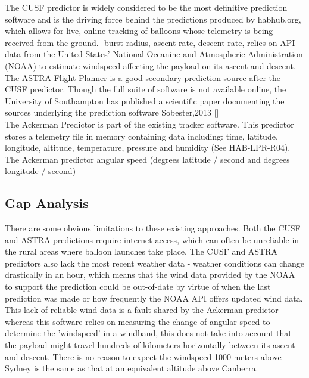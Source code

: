 \documentclass[11pt]{article}
\begin{document}
The CUSF predictor is widely considered to be the most definitive prediction software and is the driving force behind the predictions produced by habhub.org, which allows for live, online tracking of balloons whose telemetry is being received from the ground. -burst radius, ascent rate, descent rate, relies on API data from the United States' National Oceaninc and Atmospheric Administration (NOAA) to estimate windspeed affecting the payload on its ascent and descent. \\

The ASTRA Flight Planner is a good secondary prediction source after the CUSF predictor. Though the full suite of software is not available online, the University of Southampton has published a scientific paper documenting the sources underlying the prediction software Sobester,2013 []\\

The Ackerman Predictor is part of the existing tracker software. This predictor stores a telemetry file in memory containing data including: time, latitude, longitude, altitude, temperature, pressure and humidity (See HAB-LPR-R04). The Ackerman predictor angular speed (degrees latitude / second and degrees longitude / second)  \\

\subsection{Gap Analysis}

There are some obvious limitations to these existing approaches. Both the CUSF and ASTRA predictions require internet access, which can often be unreliable in the rural areas where balloon launches take place. The CUSF and ASTRA predictors also lack the most recent weather data - weather conditions can change drastically in an hour, which means that the wind data provided by the NOAA to support the prediction could be out-of-date by virtue of when the last prediction was made or how frequently the NOAA API offers updated wind data. This lack of reliable wind data is a fault shared by the Ackerman predictor - whereas this software relies on measuring the change of angular speed to determine the 'windspeed' in a windband, this does not take into account that the payload might travel hundreds of kilometers horizontally between its ascent and descent. There is no reason to expect the windspeed 1000 meters above Sydney is the same as that at an equivalent altitude above Canberra. \\
\end{document}
